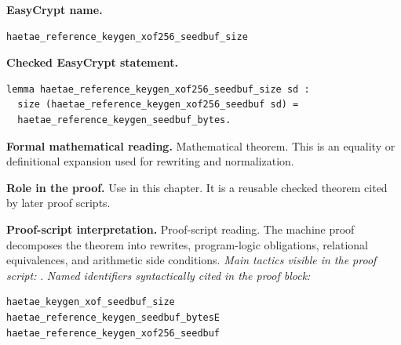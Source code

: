 \begin{formaltheorem}
\noindent\textbf{EasyCrypt name.}
\begin{lstlisting}[language=EasyCrypt,basicstyle=\ttfamily\scriptsize]
haetae_reference_keygen_xof256_seedbuf_size
\end{lstlisting}
\noindent\textbf{Checked EasyCrypt statement.}
\begin{lstlisting}[language=EasyCrypt,basicstyle=\ttfamily\scriptsize]
lemma haetae_reference_keygen_xof256_seedbuf_size sd :
  size (haetae_reference_keygen_xof256_seedbuf sd) =
  haetae_reference_keygen_seedbuf_bytes.
\end{lstlisting}
\noindent\textbf{Formal mathematical reading.}
Mathematical theorem. This is an equality or definitional expansion used for rewriting and normalization.

\noindent\textbf{Role in the proof.}
Use in this chapter. It is a reusable checked theorem cited by later proof scripts.

\noindent\textbf{Proof-script interpretation.}
Proof-script reading. The machine proof decomposes the theorem into rewrites, program-logic obligations, relational equivalences, and arithmetic side conditions.
\emph{Main tactics visible in the proof script:} .
\emph{Named identifiers syntactically cited in the proof block:}
\begin{lstlisting}[language=EasyCrypt,basicstyle=\ttfamily\scriptsize]
haetae_keygen_xof_seedbuf_size
haetae_reference_keygen_seedbuf_bytesE
haetae_reference_keygen_xof256_seedbuf
\end{lstlisting}

\end{formaltheorem}

